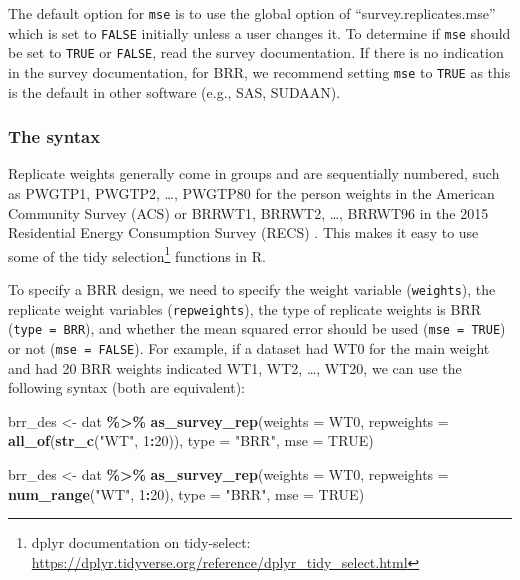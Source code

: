 \documentclass[
]{krantz}
\makeatletter
\newenvironment{Shaded}{\begin{snugshade}}{\end{snugshade}}
\newcommand{\AttributeTok}[1]{\textcolor[rgb]{0.27,0.27,0.27}{#1}}
\newcommand{\ConstantTok}[1]{\textcolor[rgb]{0.37,0.37,0.37}{#1}}
\newcommand{\DecValTok}[1]{\textcolor[rgb]{0.06,0.06,0.06}{#1}}
\newcommand{\FunctionTok}[1]{\textcolor[rgb]{0.27,0.27,0.27}{\textbf{#1}}}
\newcommand{\NormalTok}[1]{#1}
\newcommand{\OtherTok}[1]{\textcolor[rgb]{0.37,0.37,0.37}{#1}}
\newcommand{\SpecialCharTok}[1]{\textcolor[rgb]{0.43,0.43,0.43}{\textbf{#1}}}
\newcommand{\StringTok}[1]{\textcolor[rgb]{0.5,0.5,0.5}{#1}}
\newenvironment{kframe}{%
\medskip{}
\setlength{\fboxsep}{.8em}
 \def\at@end@of@kframe{}%
 \ifinner\ifhmode%
  \def\at@end@of@kframe{\end{minipage}}%
  \begin{minipage}{\columnwidth}%
 \fi\fi%
 \def\FrameCommand##1{\hskip\@totalleftmargin \hskip-\fboxsep
 \colorbox{shadecolor}{##1}\hskip-\fboxsep
     \hskip-\linewidth \hskip-\@totalleftmargin \hskip\columnwidth}%
 \MakeFramed {\advance\hsize-\width
   \@totalleftmargin\z@ \linewidth\hsize
   \@setminipage}}%
 {\par\unskip\endMakeFramed%
 \at@end@of@kframe}
\renewenvironment{Shaded}{\begin{kframe}}{\end{kframe}}
\makeatother
\begin{document}
The default option for \texttt{mse} is to use the global option of ``survey.replicates.mse'' which is set to \texttt{FALSE} initially unless a user changes it. To determine if \texttt{mse} should be set to \texttt{TRUE} or \texttt{FALSE}, read the survey documentation. If there is no indication in the survey documentation, for BRR, we recommend setting \texttt{mse} to \texttt{TRUE} as this is the default in other software (e.g., SAS, SUDAAN).

\hypertarget{the-syntax-4}{%
\subsubsection*{The syntax}\label{the-syntax-4}}


Replicate weights generally come in groups and are sequentially numbered, such as PWGTP1, PWGTP2, \ldots, PWGTP80 for the person weights in the American Community Survey (ACS) \citep{acs-pums-2021} or BRRWT1, BRRWT2, \ldots, BRRWT96 in the 2015 Residential Energy Consumption Survey (RECS) \citep{recs-2015-micro}. This makes it easy to use some of the tidy selection\footnote{dplyr documentation on tidy-select: \url{https://dplyr.tidyverse.org/reference/dplyr_tidy_select.html}} functions in R.

To specify a BRR design, we need to specify the weight variable (\texttt{weights}), the replicate weight variables (\texttt{repweights}), the type of replicate weights is BRR (\texttt{type\ =\ BRR}), and whether the mean squared error should be used (\texttt{mse\ =\ TRUE}) or not (\texttt{mse\ =\ FALSE}). For example, if a dataset had WT0 for the main weight and had 20 BRR weights indicated WT1, WT2, \ldots, WT20, we can use the following syntax (both are equivalent):

\begin{Shaded}
\begin{Highlighting}[]
\NormalTok{brr\_des }\OtherTok{\textless{}{-}}\NormalTok{ dat }\SpecialCharTok{\%\textgreater{}\%}
  \FunctionTok{as\_survey\_rep}\NormalTok{(}\AttributeTok{weights =}\NormalTok{ WT0,}
                \AttributeTok{repweights =} \FunctionTok{all\_of}\NormalTok{(}\FunctionTok{str\_c}\NormalTok{(}\StringTok{"WT"}\NormalTok{, }\DecValTok{1}\SpecialCharTok{:}\DecValTok{20}\NormalTok{)), }
                \AttributeTok{type =} \StringTok{"BRR"}\NormalTok{,}
                \AttributeTok{mse =} \ConstantTok{TRUE}\NormalTok{)}

\NormalTok{brr\_des }\OtherTok{\textless{}{-}}\NormalTok{ dat }\SpecialCharTok{\%\textgreater{}\%}
  \FunctionTok{as\_survey\_rep}\NormalTok{(}\AttributeTok{weights =}\NormalTok{ WT0,}
                \AttributeTok{repweights =} \FunctionTok{num\_range}\NormalTok{(}\StringTok{"WT"}\NormalTok{, }\DecValTok{1}\SpecialCharTok{:}\DecValTok{20}\NormalTok{),}
                \AttributeTok{type =} \StringTok{"BRR"}\NormalTok{,}
                \AttributeTok{mse =} \ConstantTok{TRUE}\NormalTok{)}
\end{Highlighting}
\end{Shaded}
\end{document}
